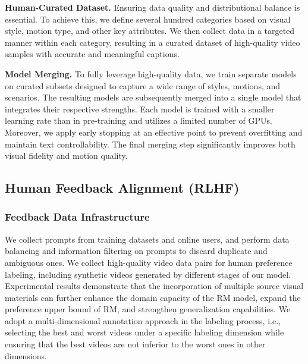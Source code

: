 \textbf{Human-Curated Dataset.} Ensuring data quality and distributional balance is essential. To achieve this, we define several hundred categories based on visual style, motion type, and other key attributes. We then collect data in a targeted manner within each category, resulting in a curated dataset of high-quality video samples with accurate and meaningful captions.


\textbf{Model Merging.} To fully leverage high-quality data, we train separate models on curated subsets designed to capture a wide range of styles, motions, and scenarios. The resulting models are subsequently merged into a single model that integrates their respective strengths. Each model is trained with a smaller learning rate than in pre-training and utilizes a limited number of GPUs. Moreover, we apply early stopping at an effective point to prevent overfitting and maintain text controllability. The final merging step significantly improves both visual fidelity and motion quality.




\subsection{Human Feedback Alignment (RLHF)}

\subsubsection{Feedback Data Infrastructure}

We collect prompts from training datasets and online users, and perform data balancing and information filtering on prompts to discard duplicate and ambiguous ones. We collect high-quality video data pairs for human preference labeling, including synthetic videos generated by different stages of our model.  Experimental results demonstrate that the incorporation of multiple source visual materials can further enhance the domain capacity of the RM model, expand the preference upper bound of RM, and strengthen generalization capabilities. We adopt a multi-dimensional annotation approach in the labeling process, i.e., selecting the best and worst videos under a specific labeling dimension while ensuring that the best videos are not inferior to the worst ones in other dimensions. 




